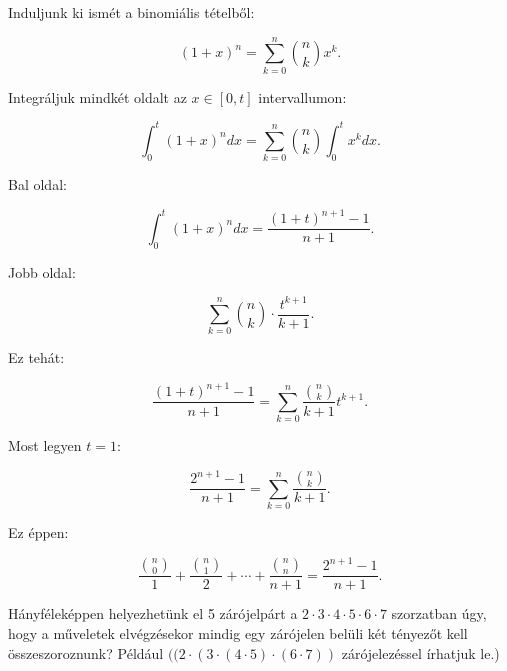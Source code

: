 \begin{solution}
 Induljunk ki ismét a binomiális tételből:

\[
(1+x)^{n}=\sum_{k=0}^{n}\binom{n}{k}x^{k}.
\]

Integráljuk mindkét oldalt az $x\in[0,t]$ intervallumon:

\[
\int_{0}^{t}(1+x)^{n}dx=\sum_{k=0}^{n}\binom{n}{k}\int_{0}^{t}x^{k}dx.
\]

Bal oldal:

\[
\int_{0}^{t}(1+x)^{n}dx=\frac{(1+t)^{n+1}-1}{n+1}.
\]

Jobb oldal:

\[
\sum_{k=0}^{n}\binom{n}{k}\cdot\frac{t^{k+1}}{k+1}.
\]

Ez tehát:

\[
\frac{(1+t)^{n+1}-1}{n+1}=\sum_{k=0}^{n}\frac{\binom{n}{k}}{k+1}t^{k+1}.
\]

Most legyen $t=1$:

\[
\frac{2^{n+1}-1}{n+1}=\sum_{k=0}^{n}\frac{\binom{n}{k}}{k+1}.
\]

Ez éppen:

\[
\frac{\binom{n}{0}}{1}+\frac{\binom{n}{1}}{2}+\cdots+\frac{\binom{n}{n}}{n+1}=\frac{2^{n+1}-1}{n+1}.
\]
\end{solution}
\begin{extraproblem}
Hányféleképpen helyezhetünk el 5 zárójelpárt a $2\cdot3\cdot4\cdot5\cdot6\cdot7$
szorzatban úgy, hogy a műveletek elvégzésekor mindig egy zárójelen
belüli két tényezőt kell összeszoroznunk? Például $((2\cdot(3\cdot(4\cdot5)\cdot(6\cdot7))$
zárójelezéssel írhatjuk le.) 
\end{extraproblem}

